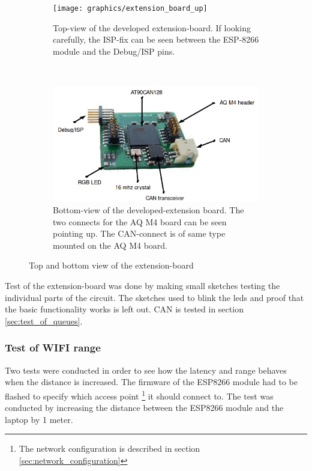\begin{figure}[H]
    \centering
    \begin{subfigure}[b]{0.45\textwidth}
        \texttt{[image: graphics/extension\_board\_up]}
        \caption{Top-view of the developed extension-board. If looking carefully, the ISP-fix can be seen between the ESP-8266 module and the Debug/ISP pins.}
        \label{fig:extension_board_up}
    \end{subfigure}
    ~ 
    \begin{subfigure}[b]{0.51\textwidth}
        \includegraphics[width=\textwidth]{graphics/extension_board_down}
        \caption{Bottom-view of the developed-extension board. The two connects for the AQ M4 board can be seen pointing up. The CAN-connect is of same type mounted on the AQ M4 board.}
        \label{fig:extension_board_down}
    \end{subfigure}
    \caption{Top and bottom view of the extension-board}\label{fig:extension_board}
\end{figure}

Test of the extension-board was done by making small sketches testing the individual parts of the circuit. The sketches used to blink the leds and proof that the basic functionality works is left out. CAN is tested in section \ref{sec:test_of_queues}.

\subsubsection*{Test of WIFI range}
Two tests were conducted in order to see how the latency and range behaves when the distance is increased.
The firmware of the ESP8266 module had to be flashed to specify which access point \footnote{The network configuration is described in section \ref{sec:network_configuration}} it should connect to.
The test was conducted by increasing the distance between the ESP8266 module and the laptop by 1 meter. 

